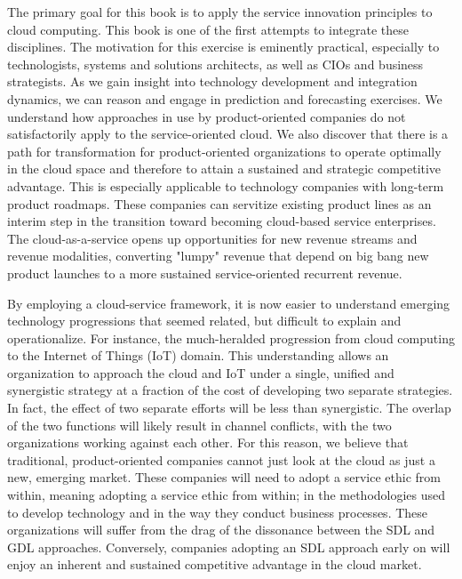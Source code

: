 The primary goal for this book is to apply the service innovation principles to cloud computing. This book is one of the first attempts to integrate these disciplines. The motivation for this exercise is eminently practical, especially to technologists, systems and solutions architects, as well as CIOs and business strategists. As we gain insight into technology development and integration dynamics, we can reason and engage in prediction and forecasting exercises. We understand how approaches in use by product-oriented companies do not satisfactorily apply to the service-oriented cloud. We also discover that there is a path for transformation for product-oriented organizations to operate optimally in the cloud space and therefore to attain a sustained and strategic competitive advantage. This is especially applicable to technology companies with long-term product roadmaps. These companies can servitize existing product lines as an interim step in the transition toward becoming cloud-based service enterprises. The cloud-as-a-service opens up opportunities for new revenue streams and revenue modalities, converting "lumpy" revenue that depend on big bang new product launches to a more sustained service-oriented recurrent revenue.
\newline

By employing a cloud-service framework, it is now easier to understand emerging technology progressions that seemed related, but difficult to explain and operationalize. For instance, the much-heralded progression from cloud computing to the Internet of Things (IoT) domain. This understanding allows an organization to approach the cloud and IoT under a single, unified and synergistic strategy at a fraction of the cost of developing two separate strategies. In fact, the effect of two separate efforts will be less than synergistic. The overlap of the two functions will likely result in channel conflicts, with the two organizations working against each other. For this reason, we believe that traditional, product-oriented companies cannot just look at the cloud as just a new, emerging market. These companies will need to adopt a service ethic from within, meaning adopting a service ethic from within; in the methodologies used to develop technology and in the way they conduct business processes. These organizations will suffer from the drag of the dissonance between the SDL and GDL approaches. Conversely, companies adopting an SDL approach early on will enjoy an inherent and sustained competitive advantage in the cloud market.
\newline
